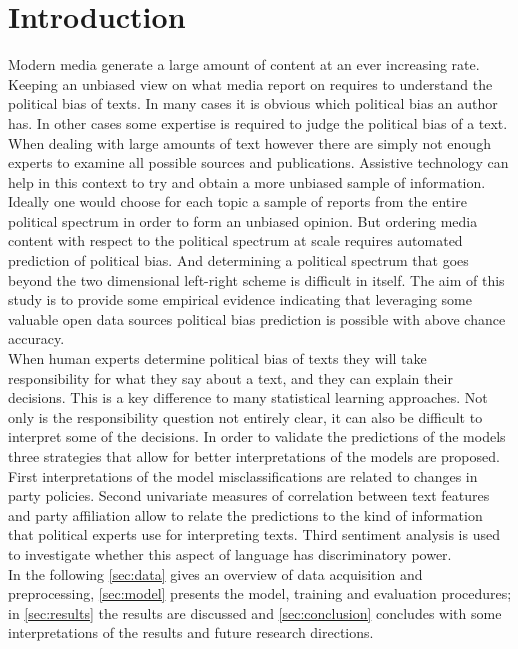 \documentclass[runningheads,a4paper]{llncs}
\begin{document}
\section{Introduction}
\label{sec:intro}
%
Modern media generate a large amount of content at an ever increasing rate. Keeping an unbiased view on what media report on requires to understand the political bias of texts. In many cases it is obvious which political bias an author has. In other cases some expertise is required to judge the political bias of a text. 
%
When dealing with large amounts of text however there are simply not enough experts to examine all possible sources and publications. Assistive technology can help in this context to try and obtain a more unbiased sample of information. \\

Ideally one would choose for each topic a sample of reports from the entire political spectrum in order to form an unbiased opinion. But ordering media content with respect to the political spectrum at scale requires automated prediction of political bias. And determining a political spectrum that goes beyond the two dimensional left-right scheme is difficult in itself. The aim of this study is to provide some empirical evidence indicating that leveraging some valuable open data sources political bias prediction is possible with above chance accuracy. \\


When human experts determine political bias of texts they will take responsibility for what they say about a text, and they can explain their decisions. This is a key difference to many statistical learning approaches. Not only is the responsibility question not entirely clear, it can also be difficult to interpret some of the decisions. In order to validate the predictions of the models three strategies that allow for better interpretations of the models are proposed. First interpretations of the model misclassifications are related to changes in party policies. Second univariate measures of correlation between text features and party affiliation allow to relate the predictions to the kind of information that political experts use for interpreting texts. Third sentiment analysis is used to investigate whether this aspect of language has discriminatory power. \\


In the following \autoref{sec:data} gives an overview of data acquisition and preprocessing, \autoref{sec:model} presents the model, training and evaluation procedures; in \autoref{sec:results} the results are discussed and \autoref{sec:conclusion} concludes with some interpretations of the results and future research directions. 
\end{document}
